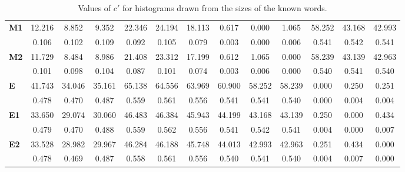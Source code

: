 \begin{table*}[h!]
\begin{center}
\begin{tabular}{| l || c | c | c || c | c | c || c | c | c || c | c | c |}
{\bf M1} & 12.216 & 8.852 & 9.352 & 22.346 & 24.194 & 18.113 & 0.617 & 0.000 & 1.065 & 58.252 & 43.168 & 42.993 \\
 & 0.106  & 0.102  & 0.109  & 0.092  & 0.105  & 0.079  & 0.003  & 0.000  & 0.006  & 0.541  & 0.542  & 0.541 \\\hline
{\bf M2} & 11.729 & 8.484 & 8.986 & 21.408 & 23.312 & 17.199 & 0.612 & 1.065 & 0.000 & 58.239 & 43.139 & 42.963 \\
 & 0.101  & 0.098  & 0.104  & 0.087  & 0.101  & 0.074  & 0.003  & 0.006  & 0.000  & 0.540  & 0.541  & 0.540 \\\hline\hline
{\bf E} & 41.743 & 34.046 & 35.161 & 65.138 & 64.556 & 63.969 & 60.900 & 58.252 & 58.239 & 0.000 & 0.250 & 0.251 \\
 & 0.478  & 0.470  & 0.487  & 0.559  & 0.561  & 0.556  & 0.541  & 0.541  & 0.540  & 0.000  & 0.004  & 0.004 \\\hline
{\bf E1} & 33.650 & 29.074 & 30.060 & 46.483 & 46.384 & 45.943 & 44.199 & 43.168 & 43.139 & 0.250 & 0.000 & 0.434 \\
 & 0.479  & 0.470  & 0.488  & 0.559  & 0.562  & 0.556  & 0.541  & 0.542  & 0.541  & 0.004  & 0.000  & 0.007 \\\hline
{\bf E2} & 33.528 & 28.982 & 29.967 & 46.284 & 46.188 & 45.748 & 44.013 & 42.993 & 42.963 & 0.251 & 0.434 & 0.000 \\
 & 0.478  & 0.469  & 0.487  & 0.558  & 0.561  & 0.556  & 0.540  & 0.541  & 0.540  & 0.004  & 0.007  & 0.000 \\\hline
\end{tabular}
\caption{Values of $c'$ for histograms drawn from the sizes of the known words.}
\end{center}
\end{table*}